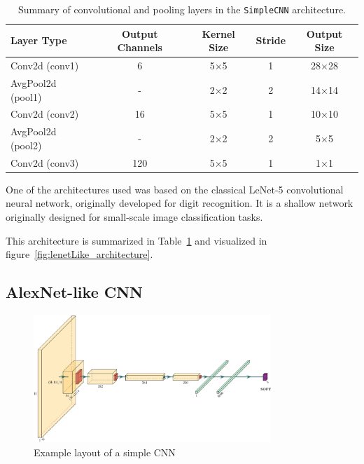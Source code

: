 \documentclass{pracalicmgr}
\begin{document}
\begin{table}[H]
\centering
\caption{Summary of convolutional and pooling layers in the \texttt{SimpleCNN} architecture.}
\begin{tabular}{|l|c|c|c|c|}
\hline
\textbf{Layer Type} & \textbf{Output Channels} & \textbf{Kernel Size} & \textbf{Stride} & \textbf{Output Size} \\
\hline
Conv2d (conv1)       & 6   & 5×5 & 1 & 28×28 \\
AvgPool2d (pool1)    & -   & 2×2 & 2 & 14×14 \\
Conv2d (conv2)       & 16  & 5×5 & 1 & 10×10 \\
AvgPool2d (pool2)    & -   & 2×2 & 2 & 5×5 \\
Conv2d (conv3)       & 120 & 5×5 & 1 & 1×1 \\
\hline
\end{tabular}
\label{tab:simplecnn_layers}
\end{table}


One of the architectures used was based on the classical LeNet-5 convolutional neural network, originally developed for digit recognition. It is a shallow network originally designed for small-scale image classification tasks.

This architecture is summarized in Table~\ref{tab:simplecnn_layers} and visualized in figure~\ref{fig:lenetLike_architecture}.

\subsection{AlexNet-like CNN}

\begin{figure}[H]
    \centering
    \includegraphics[width=0.8\textwidth]{src/AlexNetLike.pdf}
    \caption{Example layout of a simple CNN}
    \label{fig:alexnetLike_architecture}
\end{figure}
\end{document}
